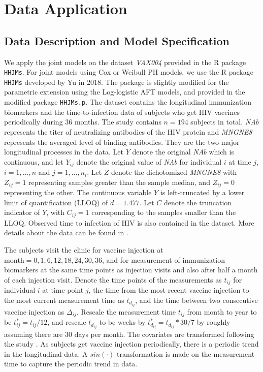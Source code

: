 \section{Data Application}
\label{sec:applc}

\subsection{Data Description and Model Specification}

We apply the joint models on the dataset \textit{VAX004} provided in the R package \texttt{HHJMs}. For joint models using Cox or Weibull PH models, we use the R package \texttt{HHJMs} developed by Yu in 2018. The package is slightly modified for the parametric extension using the Log-logistic AFT models, and provided in the modified package \texttt{HHJMs.p}.
The dataset contains the longitudinal immunization biomarkers and the time-to-infection data of subjects who get HIV vaccines periodically during $36$ months. The study contains $n=194$ subjects in total. \textit{NAb} represents the titer of neutralizing antibodies of the HIV protein and \textit{MNGNE8} represents the averaged level of binding antibodies. They are the two major longitudinal processes in the data. Let $Y$ denote the original \textit{NAb} which is continuous, and let $Y_{ij}$ denote the original value of \textit{NAb} for individual $i$ at time $j$, $i=1,\dots,n$ and $j=1,\dots,n_i$. Let $Z$ denote the dichotomized \textit{MNGNE8} with $Z_{ij}=1$ representing samples greater than the sample median, and $Z_{ij}=0$ representing the other. The continuous variable $Y$ is left-truncated by a lower limit of quantification (LLOQ) of $d=1.477$. Let $C$ denote the truncation indicator of $Y$, with $C_{ij}=1$ corresponding to the samples smaller than the LLOQ. Observed time to infection of HIV is also contained in the dataset. More details about the data can be found in \cite{yu2018joint}.

The subjects visit the clinic for vaccine injection at $\text{month}=0,1,6,12,18,24,30,36$, and for measurement of immunization biomarkers at the same time points as injection visits and also after half a month of each injection visit. Denote the time points of the measurements as $t_{ij}$ for individual $i$ at time point $j$, the time from the most recent vaccine injection to the most current measurement time as $t_{d_{ij}}$, and the time between two consecutive vaccine injection as $\Delta_{ij}$. Rescale the measurement time $t_{ij}$ from month to year to be $t_{ij}^{\ast}=t_{ij}/12$, and rescale $t_{d_{ij}}$ to be weeks by $t_{d_{ij}}^{\ast}=t_{d_{ij}}*30/7$ by roughly assuming there are 30 days per month.
The covariates are transformed following the study \cite{yu2018joint}. As subjects get vaccine injection periodically, there is a periodic trend in the longitudinal data. A $sin(\cdot)$ transformation is made on the measurement time to capture the periodic trend in data. 

